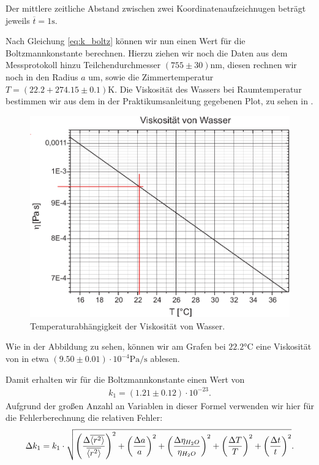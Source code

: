 Der mittlere zeitliche Abstand zwischen zwei Koordinatenaufzeichnugen beträgt jeweils $\overline{t} = 1\si{\second}$.

Nach Gleichung \eqref{eq:k_boltz} können wir nun einen Wert für die Boltzmannkonstante berechnen. Hierzu ziehen wir noch die Daten aus dem Messprotokoll hinzu Teilchendurchmesser $(755 \pm 30)\si{\nano\meter}$, diesen rechnen wir noch in den Radius $a$ um, sowie die Zimmertemperatur $T = (22.2 + 274.15 \pm 0.1)  \si{\kelvin}$. Die Viskosität des Wassers bei Raumtemperatur bestimmen wir aus dem in der Praktikumsanleitung gegebenen Plot, zu sehen in .

\begin{figure}[H]
  \centering
  \includegraphics[width=.90\textwidth]{files/viskositaet_ablesen.png}
  \caption{Temperaturabhängigkeit der Viskosität von Wasser.}
  \label{fig:viskositaet_ablesen.png}
\end{figure}

Wie in der Abbildung zu sehen, können wir am Grafen bei $22.2\si{\celsius}$ eine Viskosität von in etwa $(9.50 \pm 0.01) \cdot 10^{-4} \si{\pascal\per\second}$ ablesen.


Damit erhalten wir für die Boltzmannkonstante einen Wert von
\begin{align}
  k_{1} = (1.21 \pm  0.12) \cdot 10^{-23}.
\end{align}
Aufgrund der großen Anzahl an Variablen in dieser Formel verwenden wir hier für die Fehlerberechnung die relativen Fehler:
\begin{align}
  \Delta k_{1} = k_{1} \cdot \sqrt{\qty(\frac{\Delta \overline{\expval{r^2}}}{\overline{\expval{r^2}}})^{2} + \qty(\frac{\Delta a}{a})^{2} + \qty(\frac{\Delta \eta_{H_2 O}}{\eta_{H_2 O}})^{2} + \qty(\frac{\Delta T}{T})^{2} + \qty(\frac{\Delta t}{t})^{2}}.
\end{align}

